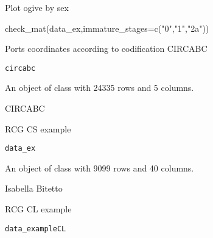 \documentclass[a4paper]{book}
\begin{document}
%
\begin{Value}
Plot ogive by sex
\end{Value}
%
\begin{Examples}
\begin{ExampleCode}
check_mat(data_ex,immature_stages=c("0","1","2a"))
\end{ExampleCode}
\end{Examples}
%
\begin{Description}\relax
Ports coordinates according to codification CIRCABC
\end{Description}
%
\begin{Usage}
\begin{verbatim}
circabc
\end{verbatim}
\end{Usage}
%
\begin{Format}
An object of class  with 24335 rows and 5 columns.
\end{Format}
%
\begin{Author}\relax
CIRCABC 
\end{Author}
%
\begin{Description}\relax
RCG CS example
\end{Description}
%
\begin{Usage}
\begin{verbatim}
data_ex
\end{verbatim}
\end{Usage}
%
\begin{Format}
An object of class  with 9099 rows and 40 columns.
\end{Format}
%
\begin{Author}\relax
Isabella Bitetto 
\end{Author}
%
\begin{Description}\relax
RCG CL example
\end{Description}
%
\begin{Usage}
\begin{verbatim}
data_exampleCL
\end{verbatim}
\end{Usage}
\end{document}
